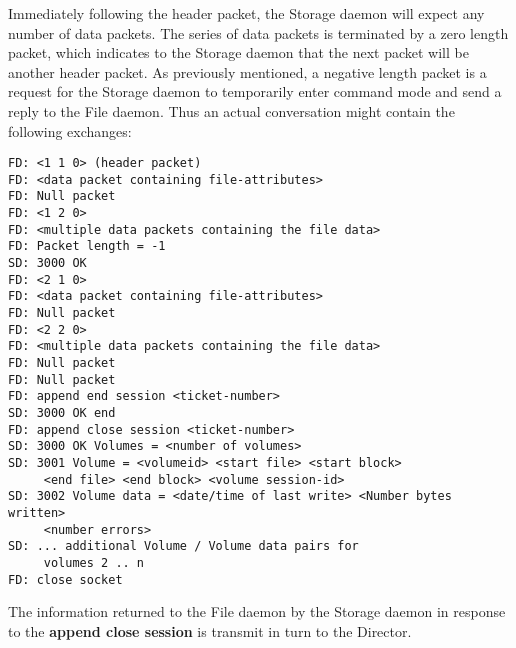 Immediately following the header packet, the Storage daemon will expect any
number of data packets. The series of data packets is terminated by a zero
length packet, which indicates to the Storage daemon that the next packet will
be another header packet. As previously mentioned, a negative length packet is
a request for the Storage daemon to temporarily enter command mode and send a
reply to the File daemon. Thus an actual conversation might contain the
following exchanges: 

\footnotesize
\begin{verbatim}
FD: <1 1 0> (header packet)
FD: <data packet containing file-attributes>
FD: Null packet
FD: <1 2 0>
FD: <multiple data packets containing the file data>
FD: Packet length = -1
SD: 3000 OK
FD: <2 1 0>
FD: <data packet containing file-attributes>
FD: Null packet
FD: <2 2 0>
FD: <multiple data packets containing the file data>
FD: Null packet
FD: Null packet
FD: append end session <ticket-number>
SD: 3000 OK end
FD: append close session <ticket-number>
SD: 3000 OK Volumes = <number of volumes>
SD: 3001 Volume = <volumeid> <start file> <start block>
     <end file> <end block> <volume session-id>
SD: 3002 Volume data = <date/time of last write> <Number bytes written>
     <number errors>
SD: ... additional Volume / Volume data pairs for
     volumes 2 .. n
FD: close socket
\end{verbatim}
\normalsize

The information returned to the File daemon by the Storage daemon in response
to the {\bf append close session} is transmit in turn to the Director. 
